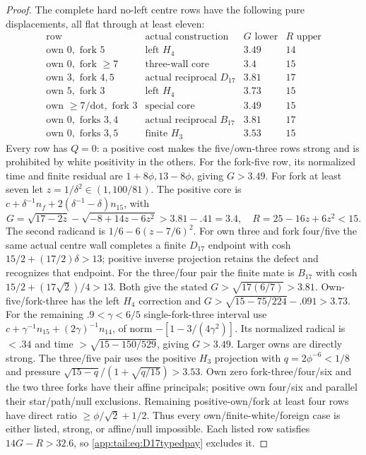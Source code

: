 \begin{proof}
The complete hard no-left centre rows have the following
pure displacements, all flat through at least eleven:
\[
\begin{array}{c|c|cc}
\text{row}&\text{actual construction}&G\text{ lower}&R\text{ upper}\\\hline
\text{own }0,\text{ fork }5&\text{left }H_4&3.49&14\\
\text{own }0,\text{ fork }\ge7&\text{three-wall core}&3.4&15\\
\text{own }3,\text{ fork }4,5&\text{actual reciprocal }D_{17}&3.81&17\\
\text{own }5,\text{ fork }3&\text{left }H_4&3.73&15\\
\text{own }\ge7/\text{dot},\text{ fork }3&\text{special core}&3.49&15\\
\text{own }0,\text{ forks }3,4&\text{actual reciprocal }B_{17}&3.81&17\\
\text{own }0,\text{ forks }3,5&\text{finite }H_3&3.53&15
\end{array}
\]
Every row has $Q=0$: a positive cost makes the five/own-three
rows strong and is prohibited by white positivity in the others.
For the fork-five row, its normalized time and finite residual
are $1+8\phi,13-8\phi$, giving $G>3.49$.
For fork at least seven let $z=1/\delta^2\in(1,100/81)$.
The positive core is
$c+\delta^{-1}n_f+2(\delta^{-1}-\delta)n_{15}$, with
\[
 G=\sqrt{17-2z}-\sqrt{-8+14z-6z^2}>3.81-.41=3.4,
 \quad R=25-16z+6z^2<15.
\]
The second radicand is $1/6-6(z-7/6)^2$.
For own three and fork four/five the same actual centre
wall completes a finite $D_{17}$ endpoint with cosh
$15/2+(17/2)\delta>13$; positive inverse projection retains
the defect and recognizes that endpoint.
For the three/four pair the finite mate is $B_{17}$ with
cosh $15/2+(17\sqrt2)/4>13$.
Both give the stated $G>\sqrt{17(6/7)}>3.81$.
Own-five/fork-three has the left $H_4$ correction and
$G>\sqrt{15-75/224}-.091>3.73$.
For the remaining $.9<\gamma<6/5$ single-fork-three interval
use $c+\gamma^{-1}n_{15}+(2\gamma)^{-1}n_{14}$,
of norm $-[1-3/(4\gamma^2)]$.
Its normalized radical is $<.34$ and time
$>\sqrt{15-150/529}$, giving $G>3.49$.
Larger owns are directly strong. The three/five pair uses the
positive $H_3$ projection with $q=2\phi^{-6}<1/8$ and
pressure $\sqrt{15-q}/(1+\sqrt{q/15})>3.53$.
Own zero fork-three/four/six and the two three forks have
their affine principals; positive own four/six and parallel
their star/path/null exclusions. Remaining positive-own/fork
at least four rows have direct ratio $\ge\phi/\sqrt2+1/2$.
Thus every own/finite-white/foreign case is either listed,
strong, or affine/null impossible.
Each listed row satisfies $14G-R>32.6$, so
\eqref{app:tail:eq:D17typedpay} excludes it.


\end{proof}
